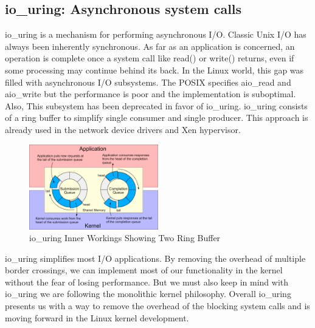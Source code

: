 \documentclass[a4paper, 11pt, twocolumn]{article}
\theoremstyle{nonumberplain}
\begin{document}
\subsection{io\_uring: Asynchronous system calls}
io\_uring is a mechanism for performing asynchronous I/O. Classic Unix I/O has
always been inherently synchronous. As far as an application is concerned,
an operation is complete once a system call like read() or write() returns,
even if some processing may continue behind its back. In the Linux world,
this gap was filled with asynchronous I/O subsystems. The POSIX specifies
aio\_read and aio\_write but the performance is poor and the implementation
is suboptimal. Also, This subsystem has been deprecated in favor of io\_uring.
io\_uring consists of a ring buffer to simplify single consumer and single
producer. This approach is already used in the network device drivers and
Xen hypervisor.
\begin{figure}[H]
    \center
    \includegraphics[width=0.5\textwidth]{uring.png}
    \caption{io\_uring Inner Workings Showing Two Ring Buffer}
    \label{uring}
\end{figure}
io\_uring simplifies most I/O applications. By removing the overhead of
multiple border crossings, we can implement most of our functionality in
the kernel without the fear of losing performance. But we must also
keep in mind with io\_uring we are following the monolithic kernel
philosophy. Overall io\_uring presents us with a way to remove the overhead
of the blocking system calls and is moving forward in the Linux kernel
development.
\end{document}
